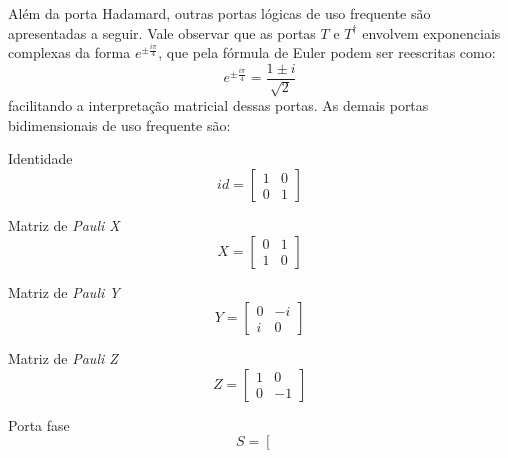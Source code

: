 Além da porta Hadamard, outras portas lógicas de uso frequente são apresentadas a seguir. Vale observar que as portas $T$ e $T^{\dagger}$ envolvem exponenciais complexas da forma $e^{\pm\frac{i\pi}{4}}$, que pela fórmula de Euler podem ser reescritas como:
    $$
        e^{\pm\frac{i\pi}{4}} = \dfrac{1\pm i}{\sqrt{2}}
    $$
\noindent facilitando a interpretação matricial dessas portas. As demais portas bidimensionais de uso frequente são:
    \begin{enumerate}
    \begin{minipage}{0.5\textwidth}
        \item Identidade
        $$
            id=\left[\begin{array}{cc}
                 1 & 0 \\
                 0 & 1
            \end{array}\right]
        $$
    \end{minipage}
    \begin{minipage}{0.5\textwidth}
        \item Matriz de \textit{Pauli X}
        $$
            X=\left[\begin{array}{cc}
                 0 & 1 \\
                 1 & 0
            \end{array}\right]
        $$
    \end{minipage}
    \begin{minipage}{0.5\textwidth}
        \item Matriz de \textit{Pauli Y}
        $$
            Y=\left[\begin{array}{cc}
                 0 & -i \\
                 i & 0
            \end{array}\right]
        $$
    \end{minipage}
    \begin{minipage}{0.5\textwidth}
        \item Matriz de \textit{Pauli Z}
        $$
            Z=\left[\begin{array}{cc}
                 1 & 0 \\
                 0 & -1
            \end{array}\right]
        $$
    \end{minipage}
    \begin{minipage}{0.5\textwidth}
        \item Porta fase
        $$
            S=\left[\begin{array}{cc}

\end{array}$$
\end{minipage}
\end{enumerate}
